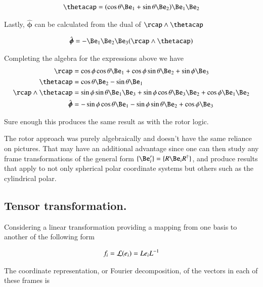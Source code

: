 \documentclass{article}
\newcommand{\phicap}[0]{\hat{\boldsymbol{\phi}}}
\begin{document}
\begin{align*}
\thetacap 
&= (\cos\theta \Be_1 + \sin\theta \Be_2) \Be_1 \Be_2 \\
\end{align*}

Lastly, $\phicap$ can be calculated from the dual of $\rcap \wedge \thetacap$

\begin{align*}
\phicap 
&= - \Be_1 \Be_2 \Be_3 (\rcap \wedge \thetacap) \\
\end{align*}

Completing the algebra for the expressions above we have
\begin{align}
\rcap 
&=
\cos\phi \cos\theta \Be_1
+ \cos\phi \sin\theta \Be_2
+ \sin\phi \Be_3 \\
\thetacap 
&= \cos\theta \Be_2 - \sin\theta \Be_1 \\
\rcap \wedge \thetacap 
&=
\sin\phi \sin\theta \Be_1 \Be_3 
+ \sin\phi \cos\theta \Be_3 \Be_2 
+ \cos\phi \Be_1 \Be_2 \\
\phicap 
&=
- \sin\phi \cos\theta \Be_1 
- \sin\phi \sin\theta \Be_2 
+ \cos\phi \Be_3 %
\end{align}

Sure enough this produces the same result as with the rotor logic.

The rotor approach was purely algebraically and doesn't have
the same reliance on pictures.  That may have
an 
additional advantage
since one can then 
study any frame transformations of the general form $\{\Be_i'\} = \{ R \Be_i R^\dagger \}$, and produce results 
that apply to 
not only spherical polar coordinate systems but others such as the cylindrical polar.

\subsection{ Tensor transformation. }

Considering a linear transformation providing a mapping from one basis to another of the following form

\begin{align*}
f_i = \mathcal{L}(e_i) = L e_i L^{-1}
\end{align*}

The coordinate representation, or Fourier decomposition, of the vectors in each of these frames is
\end{document}
